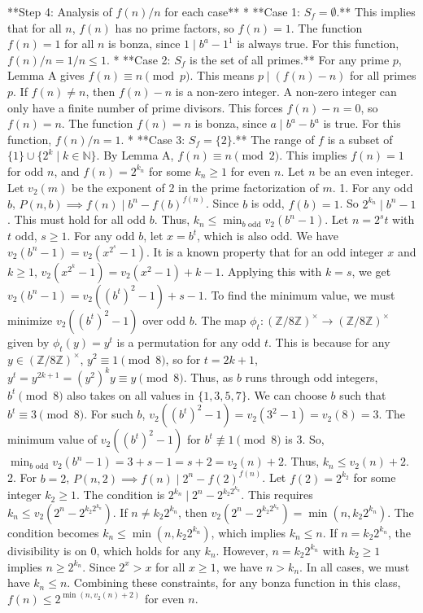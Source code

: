 \documentclass[12pt]{article}
\begin{document}
**Step 4: Analysis of $f(n)/n$ for each case**
*   **Case 1: $S_f = \emptyset$.** This implies that for all $n$, $f(n)$ has no prime factors, so $f(n)=1$. The function $f(n)=1$ for all $n$ is bonza, since $1 \mid b^a - 1^{1}$ is always true. For this function, $f(n)/n = 1/n \le 1$.
*   **Case 2: $S_f$ is the set of all primes.** For any prime $p$, Lemma A gives $f(n) \equiv n \pmod p$. This means $p \mid (f(n)-n)$ for all primes $p$. If $f(n) \ne n$, then $f(n)-n$ is a non-zero integer. A non-zero integer can only have a finite number of prime divisors. This forces $f(n)-n=0$, so $f(n)=n$. The function $f(n)=n$ is bonza, since $a \mid b^a - b^a$ is true. For this function, $f(n)/n = 1$.
*   **Case 3: $S_f = \{2\}$.** The range of $f$ is a subset of $\{1\} \cup \{2^k \mid k \in \mathbb N\}$. By Lemma A, $f(n) \equiv n \pmod 2$. This implies $f(n)=1$ for odd $n$, and $f(n)=2^{k_n}$ for some $k_n \ge 1$ for even $n$.
    Let $n$ be an even integer. Let $v_2(m)$ be the exponent of 2 in the prime factorization of $m$.
    1.  For any odd $b$, $P(n,b) \implies f(n) \mid b^n-f(b)^{f(n)}$. Since $b$ is odd, $f(b)=1$. So $2^{k_n} \mid b^n-1$. This must hold for all odd $b$. Thus, $k_n \le \min_{b \text{ odd}} v_2(b^n-1)$.
        Let $n=2^s t$ with $t$ odd, $s \ge 1$. For any odd $b$, let $x=b^t$, which is also odd. We have $v_2(b^n-1) = v_2(x^{2^s}-1)$. It is a known property that for an odd integer $x$ and $k \ge 1$, $v_2(x^{2^k}-1) = v_2(x^2-1)+k-1$. Applying this with $k=s$, we get $v_2(b^n-1) = v_2((b^t)^2-1)+s-1$.
        To find the minimum value, we must minimize $v_2((b^t)^2-1)$ over odd $b$. The map $\phi_t: (\mathbb Z/8\mathbb Z)^\times \to (\mathbb Z/8\mathbb Z)^\times$ given by $\phi_t(y)=y^t$ is a permutation for any odd $t$. This is because for any $y \in (\mathbb Z/8\mathbb Z)^\times$, $y^2 \equiv 1 \pmod 8$, so for $t=2k+1$, $y^t = y^{2k+1} = (y^2)^k y \equiv y \pmod 8$. Thus, as $b$ runs through odd integers, $b^t \pmod 8$ also takes on all values in $\{1,3,5,7\}$. We can choose $b$ such that $b^t \equiv 3 \pmod 8$. For such $b$, $v_2((b^t)^2-1) = v_2(3^2-1)=v_2(8)=3$. The minimum value of $v_2((b^t)^2-1)$ for $b^t \not\equiv 1 \pmod 8$ is 3.
        So, $\min_{b \text{ odd}} v_2(b^n-1) = 3+s-1=s+2=v_2(n)+2$. Thus, $k_n \le v_2(n)+2$.
    2.  For $b=2$, $P(n,2) \implies f(n) \mid 2^n - f(2)^{f(n)}$. Let $f(2)=2^{k_2}$ for some integer $k_2 \ge 1$. The condition is $2^{k_n} \mid 2^n - 2^{k_2 2^{k_n}}$. This requires $k_n \le v_2(2^n - 2^{k_2 2^{k_n}})$.
        If $n \ne k_2 2^{k_n}$, then $v_2(2^n - 2^{k_2 2^{k_n}}) = \min(n, k_2 2^{k_n})$. The condition becomes $k_n \le \min(n, k_2 2^{k_n})$, which implies $k_n \le n$.
        If $n = k_2 2^{k_n}$, the divisibility is on $0$, which holds for any $k_n$. However, $n = k_2 2^{k_n}$ with $k_2 \ge 1$ implies $n \ge 2^{k_n}$. Since $2^x > x$ for all $x \ge 1$, we have $n > k_n$.
        In all cases, we must have $k_n \le n$.
    Combining these constraints, for any bonza function in this class, $f(n) \le 2^{\min(n, v_2(n)+2)}$ for even $n$.
\end{document}
